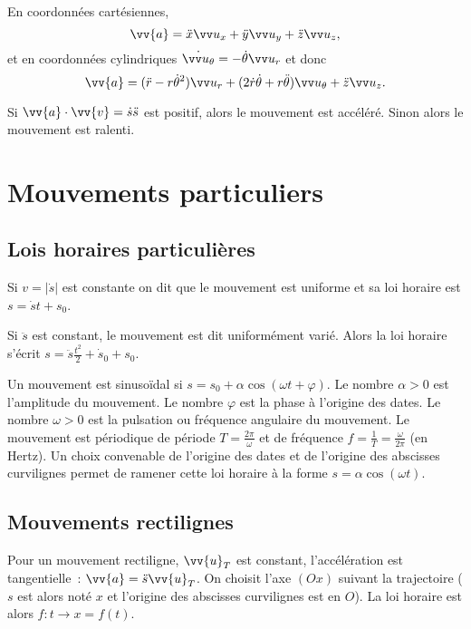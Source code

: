 En coordonnées cartésiennes,
\begin{equation}%
  \vv{a} = \ddot{x}\ux+\ddot{y}\uy+\ddot{z}\uz,%
\end{equation}%
et en coordonnées cylindriques \(\dot{\utheta}=-\dot{\theta}\ur\) et donc
\begin{equation}%
  \vv{a}=(\ddot{r}-r\dot{\theta}^2)\ur+(2\dot{r}\dot{\theta}+r\ddot{\theta})\utheta+\ddot{z}\uz.%
\end{equation}%

Si \(\vv{a}\cdot\vv{v}=\dot{s}\ddot{s}\) est positif, alors le mouvement est 
accéléré. Sinon alors le mouvement est ralenti.

\section{Mouvements particuliers}%
\label{chap1-sec:mvtparticuliers}%

\subsection{Lois horaires particulières}%
\label{chap1-sec:loishorairespart}%

Si \(v=|\dot{s}|\) est constante on dit que le mouvement est uniforme et sa loi 
horaire est \(s=\dot{s}t+s_0\).

Si \(\ddot{s}\) est constant, le mouvement est dit uniformément varié. Alors la 
loi horaire s'écrit \(s=\ddot{s} \frac{t^2}{2}+\dot{s}_0 +s_0\).

Un mouvement est sinusoïdal si \(s=s_0+\alpha \cos(\omega t+\varphi)\). Le 
nombre \(\alpha>0\) est l'amplitude du mouvement. Le nombre \(\varphi\) est la 
phase à l'origine des dates. Le nombre \(\omega>0\) est la pulsation ou 
fréquence angulaire du mouvement. Le mouvement est périodique de période 
\(T=\frac{2\pi}{\omega}\) et de fréquence \(f=\frac{1}{T}=\frac{\omega}{2\pi}\) 
(en Hertz). Un choix convenable de l'origine des dates et de l'origine des 
abscisses curvilignes permet de ramener cette loi horaire à la forme \(s = 
\alpha\cos(\omega t)\).

\subsection{Mouvements rectilignes}%
\label{chap1-sec:mvtrect}%

Pour un mouvement rectiligne, \(\vv{u}_T\) est constant, l'accélération est 
tangentielle~: \(\vv{a}=\ddot{s} \vv{u}_T\). On choisit l'axe \((Ox)\) suivant 
la trajectoire (\(s\) est alors noté \(x\) et l'origine des abscisses 
curvilignes est en \(O\)). La loi horaire est alors \(f:t \rightarrow x=f(t)\).

